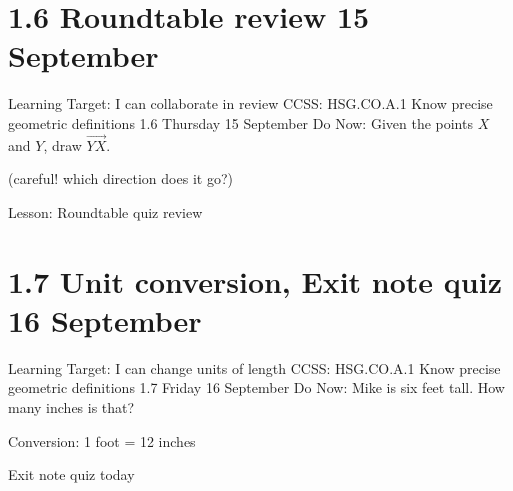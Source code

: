 \documentclass[onlytextwidth]{beamer}
\begin{document}
\section{1.6 Roundtable review \hfill 15 September}
\begin{frame}{Learning Target: I can collaborate in review}
  {CCSS: HSG.CO.A.1 Know precise geometric definitions  \hfill \alert{1.6 Thursday 15 September}}
  Do Now: Given the points $X$ and $Y$, draw $\overrightarrow{YX}$. \par \bigskip
  (careful! which direction does it go?) 
  \vspace{1cm}
  \begin{center}
  \end{center} \vspace{1cm}
  Lesson: Roundtable quiz review
\end{frame}

\section{1.7 Unit conversion, Exit note quiz \hfill 16 September}
\begin{frame}{Learning Target: I can change units of length}
  {CCSS: HSG.CO.A.1 Know precise geometric definitions  \hfill \alert{1.7 Friday 16 September}}
  Do Now: Mike is six feet tall. How many inches is that? \par \medskip
  Conversion: 1 foot = 12 inches \par
  \vspace{3cm}
  \alert{Exit note quiz today}
  \end{frame}
\end{document}
